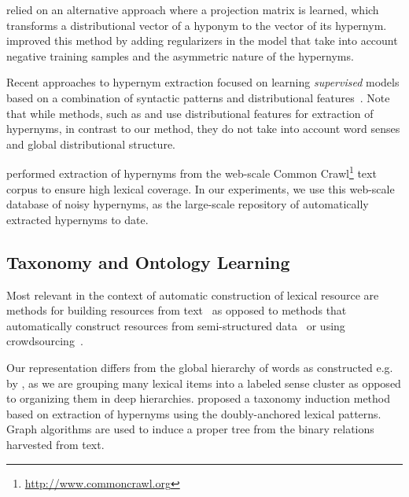 \documentclass[10pt, a4paper]{article}
\begin{document}
 relied on an alternative approach where a projection matrix is learned, which transforms a distributional vector of a hyponym to the vector of its hypernym.  improved this method by adding regularizers in the model that take into account negative training samples and the asymmetric nature of the hypernyms. 

Recent approaches to hypernym extraction focused on learning \textit{supervised} models based on a combination of syntactic patterns and distributional features~\cite{shwartz-goldberg-dagan:2016:P16-1}. Note that while methods, such as \cite{mirkin-dagan-geffet:2006:POS} and \cite{shwartz-goldberg-dagan:2016:P16-1} use distributional features for extraction of hypernyms, in contrast to our method, they do not take into account word senses and    global distributional structure. 

 performed extraction of hypernyms from the web-scale Common Crawl\footnote{\url{http://www.commoncrawl.org}} text corpus to ensure high lexical coverage. In our experiments, we use this web-scale database of noisy hypernyms, as the large-scale repository of automatically extracted hypernyms to date. 

\subsection{Taxonomy and Ontology Learning}

 Most relevant in the context of automatic construction of lexical resource are methods for building resources from  text~\cite{caraballo1999automatic,Biemann:05,cimiano2006ontology,bordea2015semeval,velardi2013ontolearn} as opposed to methods that automatically construct resources from semi-structured data~\cite{auer2007dbpedia,navigli2012babelnet} or using crowdsourcing~\cite{biemann2013creating,Braslavski:16:gwc}. 

Our representation differs from the global hierarchy of words as constructed e.g. by \cite{berant2011global,Faralli:16}, as we are grouping many lexical items into a labeled sense cluster as opposed to organizing them in deep hierarchies.  proposed a taxonomy induction method based on extraction of hypernyms using the doubly-anchored lexical patterns. Graph algorithms are used to induce a proper tree from the binary relations harvested from text. 
\end{document}
